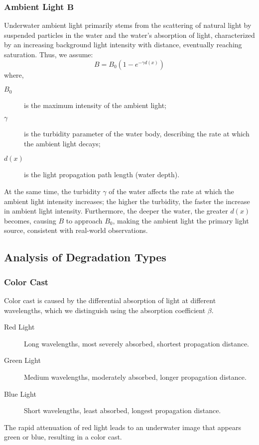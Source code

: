 \documentclass[11pt]{article}
\begin{document}
    \subsubsection{Ambient Light \( \boldsymbol{B} \)}
    Underwater ambient light primarily stems from the scattering of natural light by suspended particles in the water and the water's absorption of light, characterized by an increasing background light intensity with distance, eventually reaching saturation.
    Thus, we assume:
    \[ B = B_0(1 - e^{-\gamma d(x)}) \]
    where,
    \begin{description}
        \item [$B_0$] is the maximum intensity of the ambient light;
        \item [$\gamma$] is the turbidity parameter of the water body, describing the rate at which the ambient light decays;
        \item [$d(x)$] is the light propagation path length (water depth).
    \end{description}
    At the same time, the turbidity \( \gamma \) of the water affects the rate at which the ambient light intensity increases; the higher the turbidity, the faster the increase in ambient light intensity.
    Furthermore, the deeper the water, the greater \( d(x) \) becomes, causing \( B \) to approach \( B_0 \), making the ambient light the primary light source, consistent with real-world observations.

    \subsection{Analysis of Degradation Types}
    \subsubsection{Color Cast}
    Color cast is caused by the differential absorption of light at different wavelengths, which we distinguish using the absorption coefficient \( \beta \).
    \begin{description}
        \item [Red Light] Long wavelengths, most severely absorbed, shortest propagation distance.
        \item [Green Light] Medium wavelengths, moderately absorbed, longer propagation distance.
        \item [Blue Light] Short wavelengths, least absorbed, longest propagation distance.
    \end{description}
    The rapid attenuation of red light leads to an underwater image that appears green or blue, resulting in a color cast.
\end{document}
